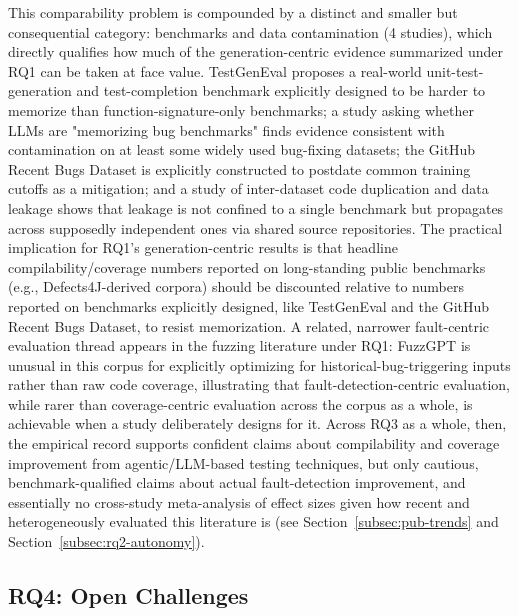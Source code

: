 This comparability problem is compounded by a distinct and smaller but
consequential category: benchmarks and data contamination (4 studies),
which directly qualifies how much of the generation-centric evidence
summarized under RQ1 can be taken at face value. TestGenEval
\cite{slr0292025} proposes a real-world unit-test-generation and
test-completion benchmark explicitly designed to be harder to
memorize than function-signature-only benchmarks; a study asking
whether LLMs are "memorizing bug benchmarks"
\cite{slr0302025} finds evidence consistent with contamination on
at least some widely used bug-fixing datasets; the GitHub Recent Bugs
Dataset \cite{slr0312023} is explicitly constructed to postdate common
training cutoffs as a mitigation; and a study of inter-dataset code
duplication and data leakage \cite{slr0322024} shows that leakage is
not confined to a single benchmark but propagates across supposedly
independent ones via shared source repositories. The practical
implication for RQ1's generation-centric results is that
headline compilability/coverage numbers reported on long-standing
public benchmarks (e.g., Defects4J-derived corpora) should be
discounted relative to numbers reported on benchmarks explicitly
designed, like TestGenEval and the GitHub Recent Bugs Dataset, to
resist memorization. A related, narrower fault-centric evaluation
thread appears in the fuzzing literature under RQ1: FuzzGPT
\cite{deng2023b} is unusual in this corpus for explicitly optimizing
for historical-bug-triggering inputs rather than raw code coverage,
illustrating that fault-detection-centric evaluation, while rarer
than coverage-centric evaluation across the corpus as a whole, is
achievable when a study deliberately designs for it. Across RQ3 as a
whole, then, the empirical record supports confident claims about
compilability and coverage improvement from agentic/LLM-based testing
techniques, but only cautious, benchmark-qualified claims about actual
fault-detection improvement, and essentially no cross-study
meta-analysis of effect sizes given how recent and heterogeneously
evaluated this literature is (see Section~\ref{subsec:pub-trends} and Section~\ref{subsec:rq2-autonomy}).

\subsection{RQ4: Open Challenges}
\label{subsec:rq4-challenges}

